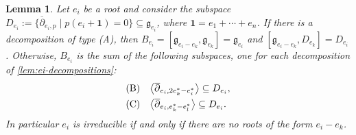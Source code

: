 \documentclass[11pt,letterpaper,reqno]{amsart}
\newtheorem{lemma}[lemma]{Lemma}
\theoremstyle{remark}
\theoremstyle{definition}
\begin{document}
\begin{lemma}\label{prop:ei-Iouter-search}
Let $e_i$ be a root and consider the subspace $D_{e_i}:=\{\overline\partial_{e_i,p}\mid p(e_i+\mathbf{1})=0\}\subseteq\mathfrak g_{e_i}$, where $\mathbf{1}=e_1+\cdots+e_n$. If there is a decomposition of type \textup{(A)}, then $B_{e_i}=[\mathfrak g_{e_i-e_k},\mathfrak g_{e_k}]=\mathfrak g_{e_i}$ and $[\mathfrak g_{e_i-e_k},D_{e_k}]=D_{e_i}$. Otherwise, $B_{e_i}$ is the sum of the following subspaces, one for each decomposition of \cref{lem:ei-decompositions}:
$$
\begin{array}{ll}
\textup{(B)} & \bigl\langle \overline{\partial}_{e_i,2e_k^*-e_i^*}\bigr\rangle\subseteq D_{e_i},\\[4pt]
\textup{(C)} & \bigl\langle \overline{\partial}_{e_i,e_k^*-e_l^*}\bigr\rangle\subseteq D_{e_i}.
\end{array}
$$
In particular $e_i$ is irreducible if and only if there are no roots of the form $e_i-e_k$.
\end{lemma}
\end{document}
